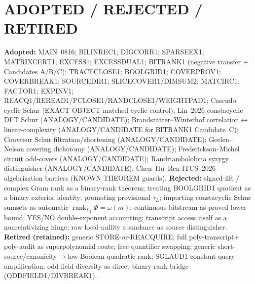 \documentclass[11pt]{article}
\begin{document}
\section*{ADOPTED / REJECTED / RETIRED}
\textbf{Adopted:} MAIN~0816; BILINREC1; DIGCORR1; SPARSEEX1; MATRIXCERT1; EXCESS1;
EXCESSDUAL1; BITRANK1 (negative transfer + Candidates A/B/C); TRACECLOSE1; BOOLGRID1;
COVERPROV1; COVERBREAK1; SOURCEDIR1; SLICECOVER1/DIMSUM2; MATCIRC1; FACTOR1; EXPINV1;
REACQ1/REREAD1/PCLOSE1/RANDCLOSE1/WEIGHTPAD1; Cascudo cyclic Schur (EXACT OBJECT matched
cyclic control); Lin~2026 constacyclic DFT Schur (ANALOGY/CANDIDATE);
Brandst\"atter--Winterhof correlation$\leftrightarrow$linear-complexity (ANALOGY/CANDIDATE
for BITRANK1 Candidate~C); Couvreur Schur filtration/shortening (ANALOGY/CANDIDATE);
Geelen--Nelson covering dichotomy (ANALOGY/CANDIDATE); Frederickson--Michel circuit
odd-covers (ANALOGY/CANDIDATE); Randriambololona syzygy distinguisher (ANALOGY/CANDIDATE);
Chen--Hu--Ren ITCS~2026 algebrization barriers (KNOWN THEOREM guards).
\textbf{Rejected:} signed-lift / complex Gram rank as a binary-rank theorem; treating
BOOLGRID1 quotient as a binary exterior identity; promoting provisional $\tau_L$;
importing constacyclic Schur sumsets as automatic $\operatorname{rank}_{\mathbb F_2}\Phi=\omega(m)$;
continuous bitstream as proved lower bound; YES/NO double-exponent accounting;
transcript access itself as a nonrelativizing hinge; raw local-nullity abundance as
source distinguisher.
\textbf{Retired (retained):} generic STORE-or-REACQUIRE; full poly-transcript$+$poly-audit
as superpolynomial route; free quantifier swapping; generic short-source/canonicity$\to$low
Boolean quadratic rank; SGLAUD1 constant-query amplification; odd-field diversity as
direct binary-rank bridge (ODDFIELD1/DIVBREAK1).
\end{document}
